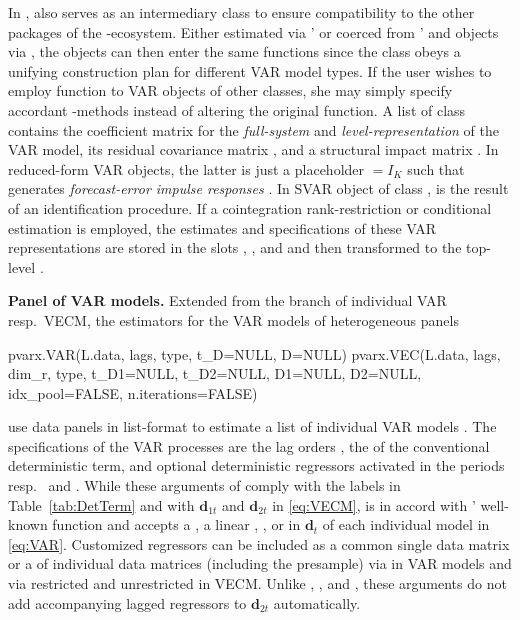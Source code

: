 In ,  also serves as an intermediary class to ensure compatibility to the other packages of the -ecosystem. Either estimated via '  or coerced from '  and  objects via , the  objects can then enter the same functions since the class obeys a unifying construction plan for different VAR model types. If the user wishes to employ  function to VAR objects of other classes, she may simply specify accordant -methods instead of altering the original  function. 
A list of class  contains the coefficient matrix  for the \textit{full-system} and \textit{level-representation} of the VAR model, its residual covariance matrix , and a structural impact matrix . In reduced-form VAR objects, the latter is just a placeholder  $ = I_K $ such that  generates \textit{forecast-error impulse responses} \cite[p.~52]{Lutkepohl2005}. In SVAR object of class ,  is the result of an identification procedure. If a cointegration rank-restriction or conditional estimation is employed, the estimates and specifications of these VAR representations are stored in the slots , , and  and then transformed to the top-level .


\textbf{Panel of VAR models.} Extended from the branch of individual VAR resp.~VECM, the estimators for the VAR models of heterogeneous panels
\begin{CodeChunk}
\begin{CodeInput}
pvarx.VAR(L.data, lags, type, t_D=NULL, D=NULL)
pvarx.VEC(L.data, lags, dim_r, type, t_D1=NULL, t_D2=NULL, 
          D1=NULL, D2=NULL, idx_pool=FALSE, n.iterations=FALSE)
\end{CodeInput}
\end{CodeChunk}
use data panels in list-format  to estimate a list of individual VAR models . The specifications of the VAR processes are the lag orders , the  of the conventional deterministic term, and optional deterministic regressors activated in the periods  resp.~ and . While these arguments of  comply with the labels in Table~\ref{tab:DetTerm} and with $ \boldsymbol{d}_{1t} $ and $ \boldsymbol{d}_{2t} $ in \eqref{eq:VECM},  is in accord with ' well-known  function and accepts a , a linear , , or  in $ \boldsymbol{d}_{t} $ of each individual model in \eqref{eq:VAR}. Customized regressors can be included as a common single data matrix or a  of individual data matrices (including the presample) via  in VAR models and via restricted  and unrestricted  in VECM. Unlike , , and , these arguments do not add accompanying lagged regressors to $ \boldsymbol{d}_{2t} $ automatically.
 
